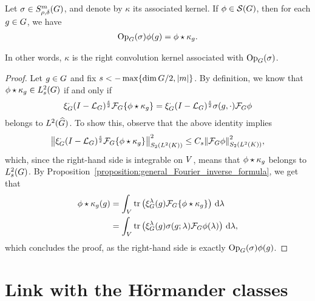 \begin{proposition}[Quantisation]
    Let $\sigma \in \SymbolClass{m}{\rho, \delta}$,
    and denote by $\kappa$ its associated kernel.
    If $\phi \in \Schwartz\Group$, then for each $g \in \Group$, we have
    \begin{align*}
        \Op(\sigma) \phi(g) = \conv{\phi}{\kappa_g}.
    \end{align*}

    In other words, $\kappa$ is the right convolution kernel associated with $\Op(\sigma)$.
\end{proposition}
\begin{proof}
    Let $g \in \Group$ and fix $s < -\max \{\dim \Group/2, \abs m\}$.
    By definition, we know that $\conv \phi \kappa_g \in \Sobolev s$ if and only if
    \begin{align*}
        \Rep \dummy \BesselPotential s \Fourier \{\conv \phi {\kappa_g}\}
        = \Rep \dummy \BesselPotential s \sigma(g, \dummy) \Fourier \phi
    \end{align*}
    belongs to $\LebesgueDual 2 \Group$.
    To show this,
    observe that the above identity implies
    \begin{align*}
        \norm[\SchattenClasses 2 {\Lebesgue 2 \CompactGroup}] {\Rep \dummy \BesselPotential s \Fourier \{\conv \phi {\kappa_g}\}}^2
        \leq C_s \norm[\SchattenClasses 2 {\Lebesgue 2 \CompactGroup}] {\Fourier \phi}^2,
    \end{align*}
    which, since the right-hand side is integrable on $\VectorSpace$,
    means that $\conv \phi {\kappa_g}$ belongs to $\Sobolev s$.
    By Proposition~\ref{proposition:general_Fourier_inverse_formula},
    we get that
    \begin{align*}
        \conv \phi {\kappa_g}(g)
        &= \int_\VectorSpace \tr\left(\Rep \lambda(g) \Fourier \{\conv \phi {\kappa_g}\}\right) \dd \lambda\\
        &= \int_\VectorSpace \tr\left(\Rep \lambda(g) \sigma(g; \lambda) \Fourier \phi(\lambda)\right) \dd \lambda,
    \end{align*}
    which concludes the proof,
    as the right-hand side is exactly $\Op(\sigma) \phi(g)$.
\end{proof}

\section{Link with the H\"ormander classes}

